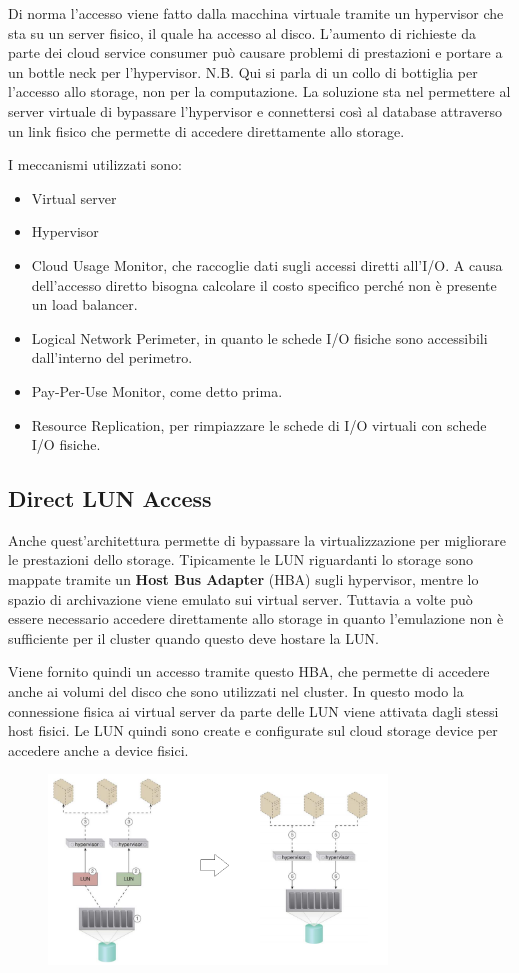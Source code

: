 Di norma l'accesso viene fatto dalla macchina virtuale tramite un hypervisor che sta su un server fisico, il quale ha accesso al disco. L'aumento di richieste da parte dei cloud service consumer può causare problemi di prestazioni e portare a un bottle neck per l'hypervisor. N.B. Qui si parla di un collo di bottiglia per l'accesso allo storage, non per la computazione. La soluzione sta nel permettere al server virtuale di bypassare l'hypervisor e connettersi così al database attraverso un link fisico che permette di accedere direttamente allo storage.

I meccanismi utilizzati sono:
\begin{itemize}
    \item Virtual server
    \item Hypervisor
    \item Cloud Usage Monitor, che raccoglie dati sugli accessi diretti all'I/O. A causa dell'accesso diretto bisogna calcolare il costo specifico perché non è presente un load balancer.
    \item Logical Network Perimeter, in quanto le schede I/O fisiche sono accessibili dall'interno del perimetro.
    \item Pay-Per-Use Monitor, come detto prima.
    \item Resource Replication, per rimpiazzare le schede di I/O virtuali con schede I/O fisiche.
\end{itemize}

\subsection{Direct LUN Access}
Anche quest'architettura permette di bypassare la virtualizzazione per migliorare le prestazioni dello storage. Tipicamente le LUN riguardanti lo storage sono mappate tramite un \textbf{Host Bus Adapter} (HBA) sugli hypervisor, mentre lo spazio di archivazione viene emulato sui virtual server. Tuttavia a volte può essere necessario accedere direttamente allo storage in quanto l'emulazione non è sufficiente per il cluster quando questo deve hostare la LUN.

Viene fornito quindi un accesso tramite questo HBA, che permette di accedere anche ai volumi del disco che sono utilizzati nel cluster. In questo modo la connessione fisica ai virtual server da parte delle LUN viene attivata dagli stessi host fisici. Le LUN quindi sono create e configurate sul cloud storage device per accedere anche a device fisici.

\begin{figure}[htb!]
    \centering
    \includegraphics[width=9cm]{./Images/cap13/13.2.png}
\end{figure}

